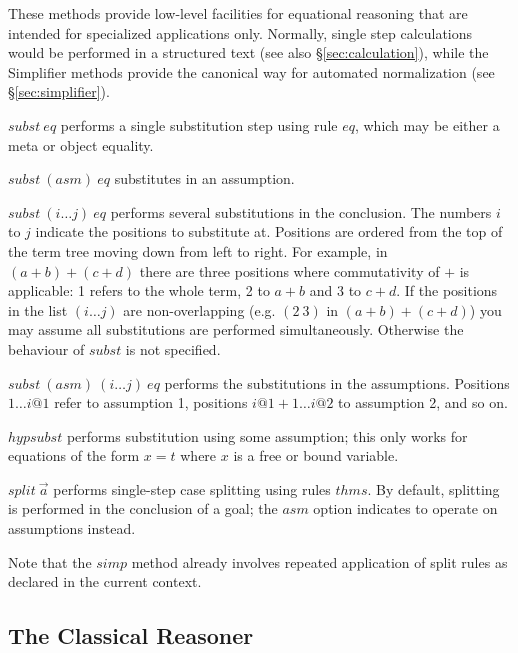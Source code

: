 These methods provide low-level facilities for equational reasoning that are
intended for specialized applications only.  Normally, single step
calculations would be performed in a structured text (see also
\S\ref{sec:calculation}), while the Simplifier methods provide the canonical
way for automated normalization (see \S\ref{sec:simplifier}).

\begin{descr}

\item [$subst~eq$] performs a single substitution step using rule $eq$, which
  may be either a meta or object equality.

\item [$subst~(asm)~eq$] substitutes in an assumption.

\item [$subst~(i \dots j)~eq$] performs several substitutions in the
conclusion. The numbers $i$ to $j$ indicate the positions to substitute at.
Positions are ordered from the top of the term tree moving down from left to
right. For example, in $(a+b)+(c+d)$ there are three positions where
commutativity of $+$ is applicable: 1 refers to the whole term, 2 to $a+b$
and 3 to $c+d$. If the positions in the list $(i \dots j)$ are
non-overlapping (e.g. $(2~3)$ in $(a+b)+(c+d)$) you may assume all
substitutions are performed simultaneously. Otherwise the behaviour of
$subst$ is not specified.

\item [$subst~(asm)~(i \dots j)~eq$] performs the substitutions in the
assumptions. Positions $1 \dots i@1$ refer
to assumption 1, positions $i@1+1 \dots i@2$ to assumption 2, and so on.

\item [$hypsubst$] performs substitution using some assumption; this only
  works for equations of the form $x = t$ where $x$ is a free or bound
  variable.

\item [$split~\vec a$] performs single-step case splitting using rules $thms$.
  By default, splitting is performed in the conclusion of a goal; the $asm$
  option indicates to operate on assumptions instead.
  
  Note that the $simp$ method already involves repeated application of split
  rules as declared in the current context.
\end{descr}


\subsection{The Classical Reasoner}\label{sec:classical}

